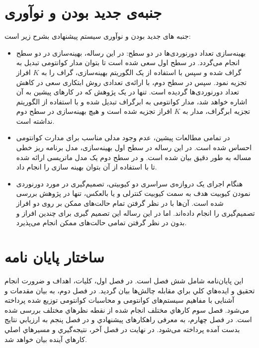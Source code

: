 \section{جنبه‌ی جدید بودن و نوآوری }

جنبه های جدید بودن و نوآوری سیستم پیشنهادی بشرح زیر است:
\begin{itemize}
\item
بهینه‌سازی تعداد دورنوردی‌ها در دو سطح: در این رساله، بهینه‌سازی در دو سطح انجام می‌گردد. در سطح اول سعی شده است تا بتوان مدار کوانتومی تبدیل به گراف شده و سپس با استفاده از یک الگوریتم بهینه‌سازی، گراف را به $K$ افراز تجزیه نمود. سپس در سطح دوم، با ارائه‌ی تعدادی روش ابتکاری سعی در کاهش تعداد دورنوردی‌ها گردیده است. تنها در یک پژوهش که در کارهای پیشین به آن اشاره خواهد شد\cite{Pablo}، مدار کوانتومی به ابرگراف تبدیل شده و با استفاده از الگوریتم تجزیه ابرگراف، مدار به $K$ افراز تجزیه شده است و هیچ بهینه‌سازی در سطح دوم نداشته است.
\item
در تمامی مطالعات پیشین، عدم وجود مدلی مناسب برای مدارت کوانتومی احساس شده است. در این رساله در سطح اول بهینه‌سازی، مدل برنامه ریز خطی مساله به طور دقیق بیان شده است. و در سطح دوم  یک مدل ماتریسی ارائه شده تا با استفاده از آن بتوان بهینه سازی را انجام داد.

\item
هنگام اجرای یک دروازه‌ی سراسری دو کیوبیتی، تصمیم‌گیری در مورد دورنوردی نمودن کیوبیت هدف به سمت کیوبیت کنترلی و یا بالعکس، تنها در پژوهش \cite{Zomorodi} بررسی شده است. آن‌ها با در نظر گرفتن تمام حالت‌های ممکن بر روی دو افراز تصمیم‌گیری را انجام داده‌اند. اما در این رساله این تصمیم گیری برای چندین افراز و بدون در نظر گرفتن تمامی حالت‌های ممکن انجام می‌پذیرد.
\end{itemize}

\section{ساختار پایان نامه}
اين پايان‌نامه شامل شش فصل است. در فصل اول، كليات، اهداف و ضرورت انجام تحقيق و ايده‌هاي كلي براي مقابله چالش‌ها بيان گردید. در فصل دوم، به بیان مقدمات و آشنایی با مفاهیم سیستم‌های کوانتومی و محاسبات کوانتومی توزیع شده پرداخته می‌شود. فصل سوم کارهاي مختلف انجام شده از نقطه نظرهاي مختلف بررسی شده است. در فصل چهارم، به معرفی راهكارهای پيشنهادي و در فصل پنجم به ارزيابي نتايج بدست آمده پرداخته می‌شود. در نهایت در فصل آخر، نتيجه‌گيري و مسيرهاي اصلي كارهاي آينده بيان خواهد شد.
